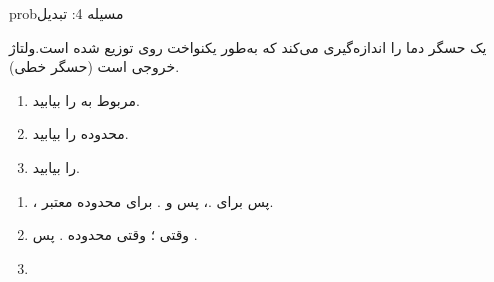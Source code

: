 \begin{PSbox}[unbreakable]{prob}{مسیله 4: تبدیل}

یک حسگر دما  را اندازه‌گیری می‌کند که به‌طور یکنواخت روی  توزیع شده است.\PSbr{}ولتاژ خروجی  است (حسگر خطی).

\begin{enumerate}
\def\labelenumi{(\alph{enumi})}
\tightlist
\item
   مربوط به  را بیابید.
\item
  محدوده  را بیابید.
\item
   را بیابید.
\end{enumerate}

\PSsolution{} 

\begin{enumerate}
\def\labelenumi{(\alph{enumi})}
\item
  ، پس  برای .\PSbr{}، پس  و .\PSbr{} برای محدوده معتبر.
\item
  وقتی ؛ وقتی \PSbr{}محدوده . پس .
\item
\end{enumerate}

\end{PSbox}

